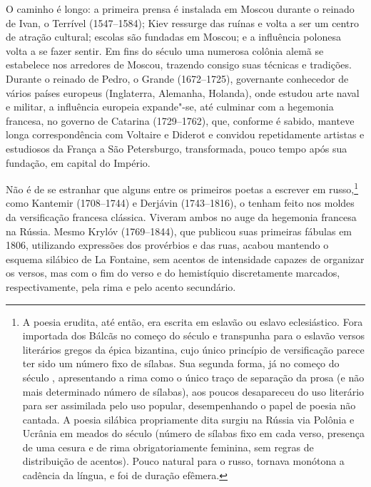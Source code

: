 O caminho é longo: a primeira prensa é instalada em Moscou durante o
rei­nado de Ivan, o Terrível (1547--1584); Kiev ressurge das ruínas e
volta a ser um centro de atração cultural; escolas são fundadas em
Moscou; e a influência po­lonesa volta a se fazer sentir. Em fins do
século  uma numerosa colônia alemã se estabelece nos arredores de
Moscou, trazendo consigo suas técnicas e tradições. Durante o reinado de
Pedro, o Grande (1672--1725), governante co­nhecedor de vários países
europeus (Inglaterra, Alemanha, Holanda), onde es­tudou arte naval e
militar, a influência europeia expande"-se, até culminar com a hegemonia
francesa, no governo de Catarina  (1729--1762), que, conforme é sabido,
manteve longa correspondência com Voltaire e Diderot e convidou
re­petidamente artistas e estudiosos da França a São Petersburgo,
transformada, pouco tempo após sua fundação, em
capital do Império.

Não é de se estranhar que alguns entre os primeiros poetas a escrever em
rus­so,\footnote{A poesia erudita, até então, era escrita em eslavão ou eslavo eclesiástico. Fora importada dos Bálcãs no começo do século  e transpunha para o eslavão versos literários gregos da épica bizantina, cujo único princípio de versificação parece ter sido um número fixo de sílabas. Sua segunda forma, já no começo do século , apresentando a rima como o único traço de separação da prosa (e não mais determinado número de sílabas), aos poucos desapareceu do uso literário para ser assimilada pelo uso popular, desempenhando o papel de poesia não cantada. A poesia silábica propriamente dita surgiu na Rússia via Polônia e Ucrânia em meados do século  (número de sílabas fixo em cada verso, presença de uma cesura e de rima obrigatoriamente feminina, sem regras de distribuição de acentos). Pouco natural para o russo, tornava monótona a cadência da língua, e foi de duração efêmera.} como Kantemir (1708--1744) e Derjávin (1743--1816), o tenham feito nos moldes da
versificação fran­cesa clássica. Viveram ambos no auge da hegemonia
francesa na Rússia. Mesmo
Krylóv (1769--1844), que publicou suas primeiras fábulas em 1806, utilizando expressões
dos provérbios e das ruas, acabou man­tendo o esquema silábico de La
Fontaine, sem acentos de intensidade capazes de organizar os versos, mas
com o fim do verso e do hemistíquio discreta­mente marcados,
respectivamente, pela rima e pelo acento secundário.

